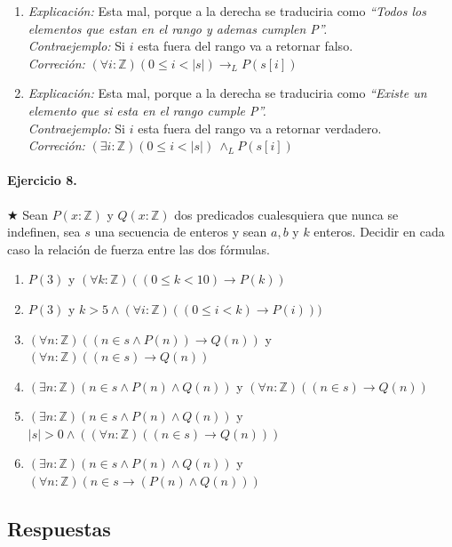 \documentclass[a4paper]{article}
\begin{document}
\begin{enumerate}[label=\alph*)]
	\item 
	\textit{Explicación: } Esta mal, porque a la derecha se traduciria como \textit{``Todos los elementos que estan en el rango y ademas cumplen P''.} \\
	\textit{Contraejemplo: } Si $i$ esta fuera del rango va a retornar falso.\\
	\textit{Correción: }
	$(\forall i: \mathbb{Z})(0\leq i<|s|)\rightarrow_L P(s[i])$ \\
	\item 
	\textit{Explicación: }Esta mal, porque a la derecha se traduciria como \textit{``Existe un elemento que si esta en el rango cumple P''.}\\
	\textit{Contraejemplo: } Si $i$  esta fuera del rango va a retornar verdadero.\\
	\textit{Correción: }
	$(\exists i: \mathbb{Z})(0\leq i<|s|)\ \wedge_LP(s[i])$ \\
\end{enumerate}
\paragraph{Ejercicio 8.} $\bigstar$ Sean $P(x:\mathbb{Z})$ y $Q(x:\mathbb{Z})$ dos predicados cualesquiera que nunca se indefinen, sea $s$ una secuencia de enteros y sean $a,b$ y $k$ enteros. Decidir en cada caso la relación de fuerza entre las dos fórmulas.
\begin{enumerate}[label=\alph*)]
\item $P(3)$ y $(\forall k: \mathbb{Z})((0\leq k <10)\rightarrow P(k))$
\item $P(3)$ y $k>5 \wedge (\forall i: \mathbb{Z})((0\leq i <k)\rightarrow P(i)))$
\item $(\forall n:\mathbb{Z})((n \in s \wedge P(n))\rightarrow Q(n))$ y $(\forall n: \mathbb{Z})((n \in s)\rightarrow Q(n))$
\item $(\exists n: \mathbb{Z})(n \in s \wedge P(n) \wedge Q(n))$ y $(\forall n:\mathbb{Z})((n\in s)\rightarrow Q(n))$
\item $(\exists n: \mathbb{Z})(n \in s \wedge P(n) \wedge Q(n))$ y $|s|>0\wedge ((\forall n:\mathbb{Z})((n\in s)\rightarrow Q(n)))$
\item $(\exists n: \mathbb{Z})(n \in s \wedge P(n) \wedge Q(n))$ y $(\forall n:\mathbb{Z})(n\in s\rightarrow (P(n)\wedge Q(n)))$
\end{enumerate}

\subsection*{Respuestas}
\end{document}
